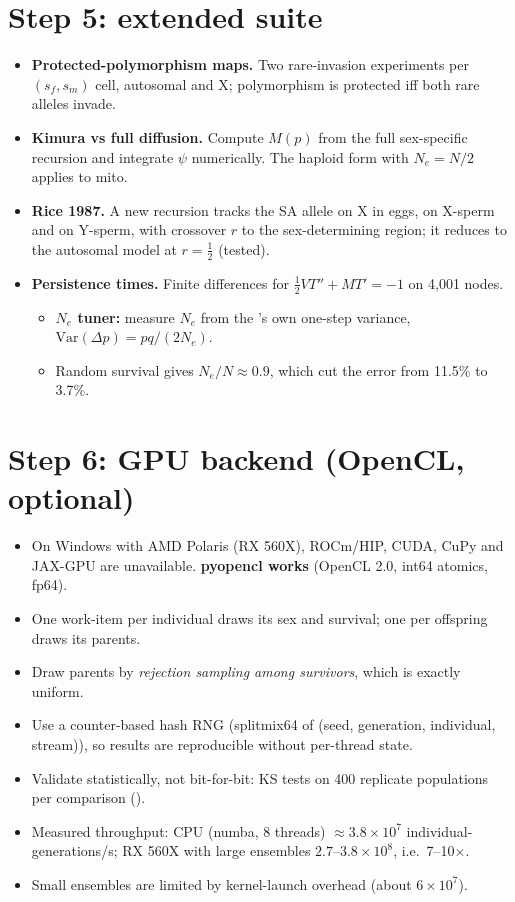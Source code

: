 \section{Step 5: extended suite}
\begin{itemize}
\item \textbf{Protected-polymorphism maps.} Two rare-invasion experiments per $(s_f,s_m)$ cell, autosomal and X; polymorphism is protected iff both rare alleles invade.
\item \textbf{Kimura vs full diffusion.} Compute $M(p)$ from the full sex-specific recursion and integrate $\psi$ numerically. The haploid form with $N_e=N/2$ applies to mito.
\item \textbf{Rice 1987.} A new recursion tracks the SA allele on X in eggs, on X-sperm and on Y-sperm, with crossover $r$ to the sex-determining region; it reduces to the autosomal model at $r=\tfrac12$ (tested).
\item \textbf{Persistence times.} Finite differences for $\tfrac12VT''+MT'=-1$ on 4,001 nodes.
  \begin{itemize}
  \item \textbf{$N_e$ tuner:} measure $N_e$ from the \IBM's own one-step variance, $\mathrm{Var}(\Delta p)=pq/(2N_e)$.
  \item Random survival gives $N_e/N\approx0.9$, which cut the error from 11.5\% to 3.7\%.
  \end{itemize}
\end{itemize}

\section{Step 6: GPU backend (OpenCL, optional)}
\begin{itemize}
\item On Windows with AMD Polaris (RX 560X), ROCm/HIP, CUDA, CuPy and JAX-GPU are unavailable. \textbf{pyopencl works} (OpenCL 2.0, int64 atomics, fp64).
\item One work-item per individual draws its sex and survival; one per offspring draws its parents.
\item Draw parents by \emph{rejection sampling among survivors}, which is exactly uniform.
\item Use a counter-based hash RNG (splitmix64 of (seed, generation, individual, stream)), so results are reproducible without per-thread state.
\item Validate statistically, not bit-for-bit: KS tests on 400 replicate populations per comparison ().
\item Measured throughput: CPU (numba, 8 threads) $\approx3.8\times10^7$ individual-generations/s; RX 560X with large ensembles $2.7$--$3.8\times10^8$, i.e.\ 7--10$\times$.
\item Small ensembles are limited by kernel-launch overhead (about $6\times10^7$).
\end{itemize}

